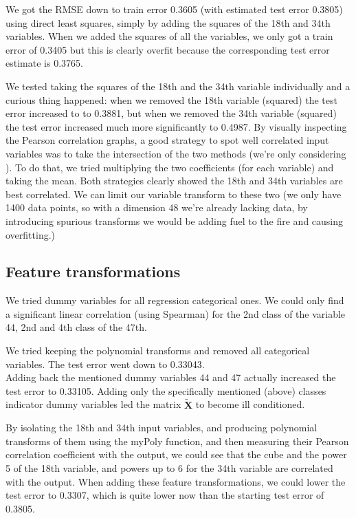 \documentclass{article} %
\begin{document}
We got the RMSE down to train error 0.3605 (with estimated test error 0.3805) using direct least squares, simply by adding the squares of the 18th and 34th variables. When we added the squares of all the variables, we only got a train error of 0.3405 but this is clearly overfit because the corresponding test error estimate is 0.3765.

We tested taking the squares of the 18th and the 34th variable individually and a curious thing happened: when we removed the 18th variable (squared) the test error increased to to 0.3881, but when we removed the 34th variable (squared) the test error increased much more significantly to 0.4987.
\label{sec:regridgreg}
By visually inspecting the Pearson correlation graphs, a good strategy to spot well correlated input variables was to take the intersection of the two methods (we’re only considering ). To do that, we tried multiplying the two coefficients (for each variable) and taking the mean. Both strategies clearly showed the 18th and 34th variables are best correlated. We can limit our variable transform to these two (we only have 1400 data points, so with a dimension 48 we’re already lacking data, by introducing spurious transforms we would be adding fuel to the fire and causing overfitting.)

\subsection{Feature transformations}
We tried dummy variables for all regression categorical ones. We could only find a significant linear correlation (using Spearman) for the 2nd class of the variable 44, 2nd and 4th class of the 47th.

We tried keeping the polynomial transforms and removed all categorical variables. The test error went down to 0.33043.\\

Adding back the mentioned dummy variables 44 and 47 actually increased the test error to 0.33105. Adding only the specifically mentioned (above) classes indicator dummy variables led the matrix $\mathbf{\tilde{X}}$ to become ill conditioned.

By isolating the 18th and 34th input variables, and producing polynomial transforms of them using the myPoly function, and then measuring their Pearson correlation coefficient with the output, we could see that the cube and the power 5 of the 18th variable, and powers up to 6 for the 34th variable are correlated with the output. When adding these feature transformations, we could lower the test error to 0.3307, which is quite lower now than the starting test error of 0.3805.
\end{document}
